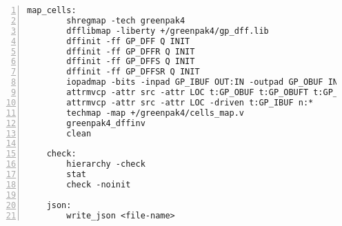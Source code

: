 \begin{lstlisting}[numbers=left,frame=single]
    map_cells:
        shregmap -tech greenpak4
        dfflibmap -liberty +/greenpak4/gp_dff.lib
        dffinit -ff GP_DFF Q INIT
        dffinit -ff GP_DFFR Q INIT
        dffinit -ff GP_DFFS Q INIT
        dffinit -ff GP_DFFSR Q INIT
        iopadmap -bits -inpad GP_IBUF OUT:IN -outpad GP_OBUF IN:OUT -inoutpad GP_OBUF OUT:IN -toutpad GP_OBUFT OE:IN:OUT -tinoutpad GP_IOBUF OE:OUT:IN:IO
        attrmvcp -attr src -attr LOC t:GP_OBUF t:GP_OBUFT t:GP_IOBUF n:*
        attrmvcp -attr src -attr LOC -driven t:GP_IBUF n:*
        techmap -map +/greenpak4/cells_map.v
        greenpak4_dffinv
        clean

    check:
        hierarchy -check
        stat
        check -noinit

    json:
        write_json <file-name>
\end{lstlisting}

